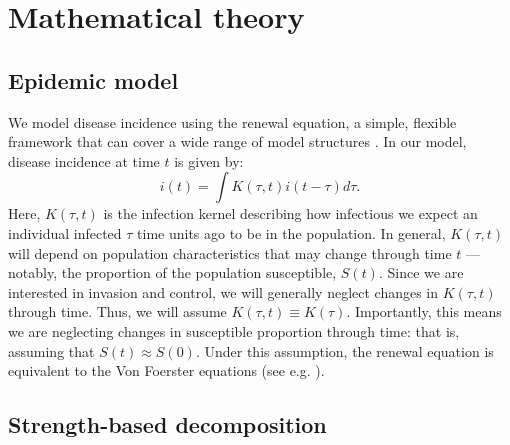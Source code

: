 \documentclass[12pt]{article}
\begin{document}
\section{Mathematical theory}

\subsection{Epidemic model}

We model disease incidence using the renewal equation, a simple, flexible framework that can cover a wide range of model structures \citep{heesterbeek1996concept, diekmann2000mathematical, roberts2004modelling, aldis2005integral, wallinga2007generation, roberts2007model, Champredon2018equivalence}.
In our model, disease incidence at time $t$ is given by:
\begin{equation}
i(t) = \int K(\tau, t) i(t-\tau) d\tau.
\end{equation}
Here, $K(\tau, t)$ is the infection kernel describing how infectious we expect an individual infected $\tau$ time units ago to be in the population.
In general, $K(\tau, t)$ will depend on population characteristics that may change through time $t$ --- notably, the proportion of the population susceptible, $S(t)$.
Since we are interested in invasion and control, we will generally neglect changes in $K(\tau, t)$ through time.
Thus, we will assume $K(\tau, t) \equiv K(\tau)$.
Importantly, this means we are neglecting changes in susceptible proportion through time: that is, assuming that $S(t) \approx S(0)$.
Under this assumption, the renewal equation is equivalent to the Von Foerster equations (see e.g. \cite{fraser2004factors}).

\subsection{Strength-based decomposition}
\end{document}
